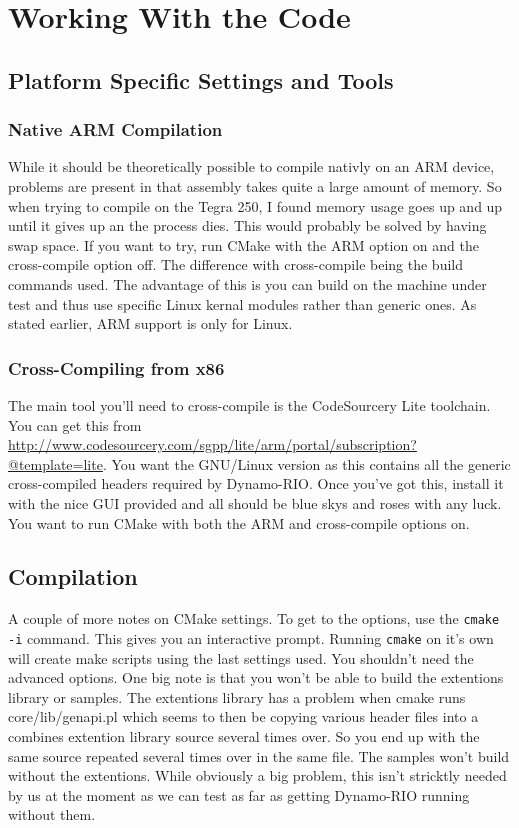\documentclass[a4paper]{article}
\begin{document}
\section{Working With the Code}
\subsection{Platform Specific Settings and Tools}
\subsubsection{Native ARM Compilation}
While it should be theoretically possible to compile nativly on an ARM device,
problems are present in that assembly takes quite a large amount of memory. So
when trying to compile on the Tegra 250, I found memory usage goes up and up
until it gives up an the process dies. This would probably be solved by having
swap space. If you want to try, run CMake with the ARM option on and the
cross-compile option off. The difference with cross-compile being the build
commands used. The advantage of this is you can build on the machine under test
and thus use specific Linux kernal modules rather than generic ones. As stated
earlier, ARM support is only for Linux.

\subsubsection{Cross-Compiling from x86}
The main tool you'll need to cross-compile is the CodeSourcery Lite toolchain.
You can get this from
\url{http://www.codesourcery.com/sgpp/lite/arm/portal/subscription?@template=lite}.
You want the GNU/Linux version as this contains all the generic cross-compiled
headers required by Dynamo-RIO. Once you've got this, install it with the nice
GUI provided and all should be blue skys and roses with any luck. You want to
run CMake with both the ARM and cross-compile options on. 

\subsection{Compilation}
A couple of more notes on CMake settings. To get to the options, use the
\texttt{cmake -i} command. This gives you an interactive prompt. Running
\texttt{cmake} on it's own will create make scripts using the last settings
used. You shouldn't need the advanced options. One big note is that you won't be
able to build the extentions library or samples. The extentions library has a
problem when cmake runs core/lib/genapi.pl which seems to then be copying
various header files into a combines extention library source several times
over. So you end up with the same source repeated several times over in the same
file. The samples won't build without the extentions. While obviously a big
problem, this isn't stricktly needed by us at the moment as we can test as far
as getting Dynamo-RIO running without them.
\end{document}
